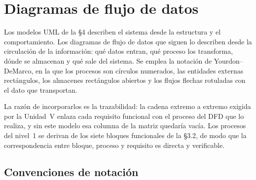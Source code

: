 %

\section{Diagramas de flujo de datos}
\label{sec:dfd}

Los modelos UML de la §4 describen el sistema desde la estructura y el comportamiento. Los diagramas
de flujo de datos que siguen lo describen desde la circulación de la información: qué datos entran,
qué proceso los transforma, dónde se almacenan y qué sale del sistema. Se emplea la notación de
Yourdon--DeMarco, en la que los procesos son círculos numerados, las entidades externas rectángulos,
los almacenes rectángulos abiertos y los flujos flechas rotuladas con el dato que transportan.

La razón de incorporarlos es la trazabilidad: la cadena extremo a extremo exigida por la Unidad~V
enlaza cada requisito funcional con el proceso del DFD que lo realiza, y sin este modelo esa columna
de la matriz quedaría vacía. Los procesos del nivel~1 se derivan de los siete bloques funcionales de
la §3.2, de modo que la correspondencia entre bloque, proceso y requisito es directa y verificable.

\subsection{Convenciones de notación}

